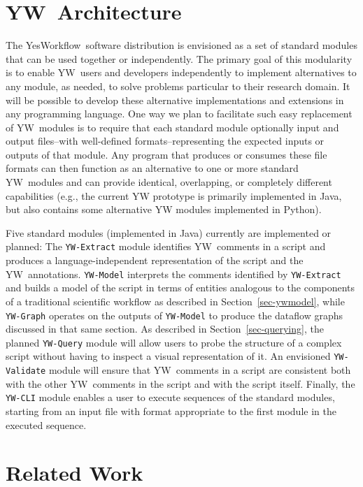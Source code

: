 \documentclass[15]{ijdc-v9}
\newcommand{\YW}{\textsf{YesWorkflow}}
\newcommand{\yw}{\textsf{YW}}
\newcommand{\ywt}{YW}
\newcommand{\ywm}[1]{\texttt{\small #1}}
\begin{document}
\section{\ywt\ Architecture}

The \YW\ software distribution is envisioned as a set of standard
modules that can be used together or independently. The primary goal
of this modularity is to enable \yw\ users and developers
independently to implement alternatives to any module, as needed, to
solve problems particular to their research domain. It will be
possible to develop these alternative implementations and extensions
in any programming language.  One way we plan to facilitate such easy
replacement of \yw\ modules is to require that each standard module
optionally input and output files--with well-defined
formats--representing the expected inputs or outputs of that
module. Any program that produces or consumes these file formats can
then function as an alternative to one or more standard \yw\ modules
and can provide identical, overlapping, or completely different
capabilities (e.g., the current \textsf{YW} prototype is primarily
implemented in Java, but also contains some alternative \textsf{YW}
modules implemented in Python).

Five standard modules (implemented in Java) currently are implemented
or planned: The \ywm{YW-Extract} module identifies \yw\ comments in a
script and produces a language-independent representation of the
script and the \yw\ annotations. \ywm{YW-Model} interprets the comments
identified by \ywm{YW-Extract} and builds a model of the script in
terms of entities analogous to the components of a traditional
scientific workflow as described in Section~\ref{sec-ywmodel}, while
\ywm{YW-Graph} operates on the outputs of \ywm{YW-Model} to produce
the dataflow graphs discussed in that same section. As described in
Section~\ref{sec-querying}, the planned \ywm{YW-Query} module will
allow users to probe the structure of a complex script without having
to inspect a visual representation of it. An envisioned
\ywm{YW-Validate} module will ensure that \yw\ comments in a script
are consistent both with the other \yw\ comments in the script and
with the script itself. Finally, the \ywm{YW-CLI} module enables a
user to execute sequences of the standard modules, starting from an
input file with format appropriate to the first module in the executed
sequence.


\section{Related Work}
\end{document}
